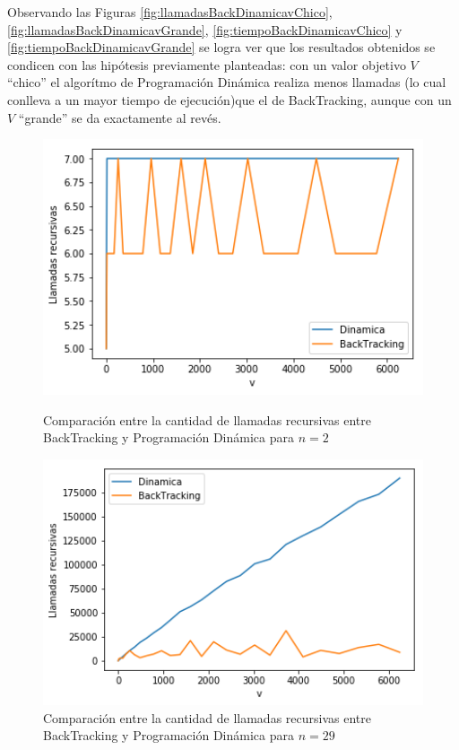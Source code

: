 Observando las Figuras \ref{fig:llamadasBackDinamicavChico}, \ref{fig:llamadasBackDinamicavGrande},
\ref{fig:tiempoBackDinamicavChico} y \ref{fig:tiempoBackDinamicavGrande} se logra
ver que los resultados obtenidos se condicen con las hip\'otesis previamente planteadas: con un valor objetivo $V$
``chico'' el algor\'itmo de Programaci\'on Din\'amica realiza menos llamadas (lo cual conlleva a un mayor tiempo
de ejecuci\'on)que el de BackTracking, aunque con un $V$ ``grande'' se da exactamente al rev\'es.
\begin{figure}[H] 
    \centering
    \begin{minipage}{0.45\textwidth}
        \centering
        \includegraphics[width=1\textwidth]{img/llamadas/n/backDinNChico.png} %
        \caption{Comparaci\'on entre la cantidad de llamadas recursivas entre BackTracking y Programaci\'on
        Din\'amica para $n=2$}
        \label{fig:backDinNChico} 
    \end{minipage}\hfill
    \begin{minipage}{0.45\textwidth}
        \centering
        \includegraphics[width=1\textwidth]{img/llamadas/n/backDinNGrande.png} %
        \caption{Comparaci\'on entre la cantidad de llamadas recursivas entre BackTracking y Programaci\'on
        \label{fig:backDinNGrande} 
        Din\'amica para $n=29$}
    \end{minipage}
\end{figure}

